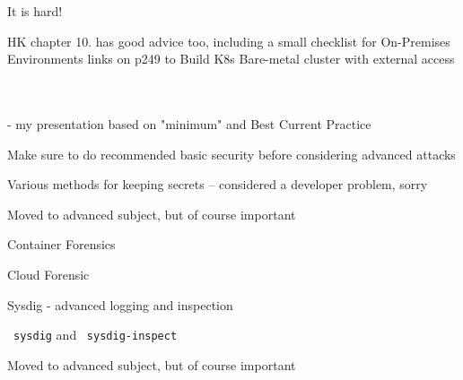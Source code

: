 \documentclass[Screen16to9,17pt]{foils}
\begin{document}


\begin{list2}
\item It is hard!


\item HK chapter 10. has good advice too, including a small checklist for On-Premises Environments
links on p249 to Build K8s Bare-metal cluster with external access\\
\\
\\
\end{list2}


\myquestionspage


- my presentation based on "minimum" and Best Current Practice

Make sure to do recommended basic security before considering advanced attacks

Various methods for keeping secrets -- considered a developer problem, sorry
\slide{}


Moved to advanced subject, but of course important

\begin{list2}
\item Container Forensics
\item Cloud Forensic
\item Sysdig - advanced logging and inspection
\item \faWrench\ \verb+sysdig+ and \faWrench\ \verb+sysdig-inspect+
\end{list2}



\begin{list2}
\item Moved to advanced subject, but of course important
\end{list2}

\end{document}
